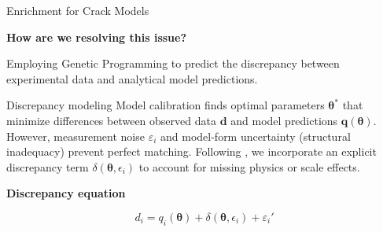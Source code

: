 \begin{frame}{Enrichment for Crack Models}

\justifying

\textbf{How are we resolving this issue?}

Employing Genetic Programming to predict the discrepancy between experimental data and analytical model predictions.

\vspace{0.15cm}

\begin{block}{Discrepancy modeling}
\justifying 
Model calibration finds optimal parameters $\boldsymbol{\theta}^{\ast}$ that minimize differences between observed data $\mathbf{d}$ and model predictions $\mathbf{q}(\boldsymbol{\theta})$. However, measurement noise $\varepsilon_i$ and model-form uncertainty (structural inadequacy) prevent perfect matching. Following \cite{brynjarsdottir_learning_2014}, we incorporate an explicit discrepancy term $\delta(\boldsymbol{\theta}, \epsilon_i)$ to account for missing physics or scale effects.
\end{block}

\vspace{0.20cm}

\textbf{Discrepancy equation}

\vspace{0.2cm}

\begin{equation}
    \label{eq:discrepancy_model}
    d_i = q_i(\boldsymbol{\theta}) + \delta(\boldsymbol{\theta}, \epsilon_i) + \varepsilon_i'
\end{equation}

\end{frame}